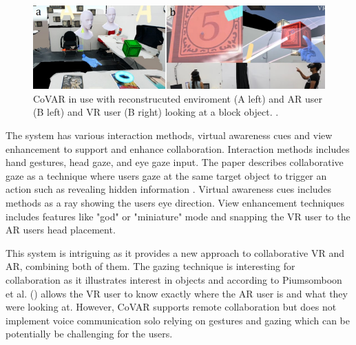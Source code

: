 \begin{figure}[!ht]
     \centering
     \includegraphics[width=.9\textwidth]{./fig/related_work/coVAR.png}
     \captionsetup{width=0.9\linewidth}
     \caption{CoVAR in use with reconstrucuted enviroment (A left) and AR user (B left) and VR user (B right) looking at a block object.  \cite{greenwald2019electrovr}. }
     \label{fig:coVAR}
 \end{figure}

The system has various interaction methods, virtual awareness cues and view enhancement to support and enhance collaboration. Interaction methods includes hand gestures, head gaze, and eye gaze input. The paper describes collaborative gaze as a technique where users gaze at the same target object to trigger an action such as revealing hidden information \cite{piumsomboon2017covar}.  Virtual awareness cues includes methods as a ray showing the users eye direction. View enhancement techniques includes features like "god" or "miniature" mode and snapping the VR user to the AR users head placement.

This system is intriguing as it provides a new approach to collaborative VR and AR, combining both of them. The gazing technique is interesting for collaboration as it illustrates interest in objects and according to Piumsomboon et al. (\citeyear{piumsomboon2017covar}) allows the VR user to know exactly where the AR user is and what they were looking at. However, CoVAR supports remote collaboration but does not implement voice communication solo relying on gestures and gazing which can be potentially be challenging for the users.   




